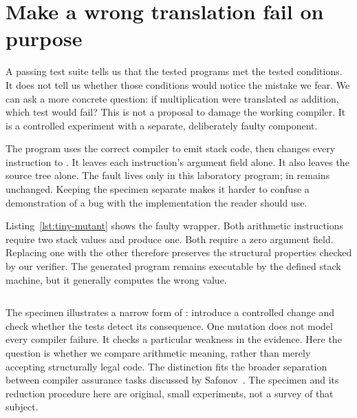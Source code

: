 \section{Make a wrong translation fail on purpose}
\label{sec:tiny-fault-lab}

A passing test suite tells us that the tested programs met the tested conditions.
It does not tell us whether those conditions would notice the mistake we fear.
We can ask a more concrete question: if multiplication were translated as addition, which test would fail?
This is not a proposal to damage the working compiler.
It is a controlled experiment with a separate, deliberately faulty component.

The program  uses the correct compiler to emit stack code, then changes every  instruction to .
It leaves each instruction's argument field alone.
It also leaves the source tree alone.
The fault lives only in this laboratory program;  in  remains unchanged.
Keeping the specimen separate makes it harder to confuse a demonstration of a bug with the implementation the reader should use.

Listing~\ref{lst:tiny-mutant} shows the faulty wrapper.
Both arithmetic instructions require two stack values and produce one.
Both require a zero argument field.
Replacing one with the other therefore preserves the structural properties checked by our verifier.
The generated program remains executable by the defined stack machine, but it generally computes the wrong value.

\begin{listing}
  \inputminted[firstline=7,lastline=15]{c}{example-code/ch01/fault_lab.c}
  \caption{This isolated wrapper deliberately changes multiplication into addition.}
  \label{lst:tiny-mutant}
\end{listing}

The specimen illustrates a narrow form of : introduce a controlled change and check whether the tests detect its consequence.
One mutation does not model every compiler failure.
It checks a particular weakness in the evidence.
Here the question is whether we compare arithmetic meaning, rather than merely accepting structurally legal code.
The distinction fits the broader separation between compiler assurance tasks discussed by Safonov~\cite{safonov-2010-trustworthy}.
The specimen and its reduction procedure here are original, small experiments, not a survey of that subject.

